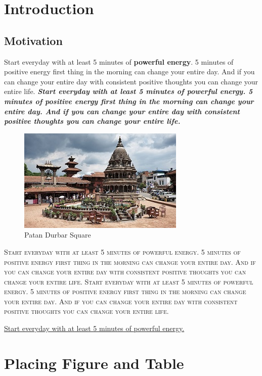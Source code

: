 \documentclass[12pt]{report}
\begin{document}
\tableofcontents
\listoffigures
\listoftables

\chapter{Introduction}
\section{Motivation}
Start everyday with at least 5 minutes of \textbf{powerful energy}. 5 minutes of positive energy first thing in the morning can change your entire day. And if you can change your entire day with consistent positive thoughts you can change your entire life.
\textbf{\textit{Start everyday with at least 5 minutes of powerful energy. 5 minutes of positive energy first thing in the morning can change your entire day. And if you can change your entire day with consistent positive thoughts you can change your entire life.}}

\begin{figure}[h]
\centering
\includegraphics[scale=0.1]{patandurbar.jpg}
\caption{Patan Durbar Square}
\end{figure}

\textsc{Start everyday with at least 5 minutes of powerful energy. 5 minutes of positive energy first thing in the morning can change your entire day. And if you can change your entire day with consistent positive thoughts you can change your entire life.
Start everyday with at least 5 minutes of powerful energy. 5 minutes of positive energy first thing in the morning can change your entire day. And if you can change your entire day with consistent positive thoughts you can change your entire life.}

\underline{Start everyday with at least 5 minutes of powerful energy.}

\chapter{Placing Figure and Table}
\end{document}
